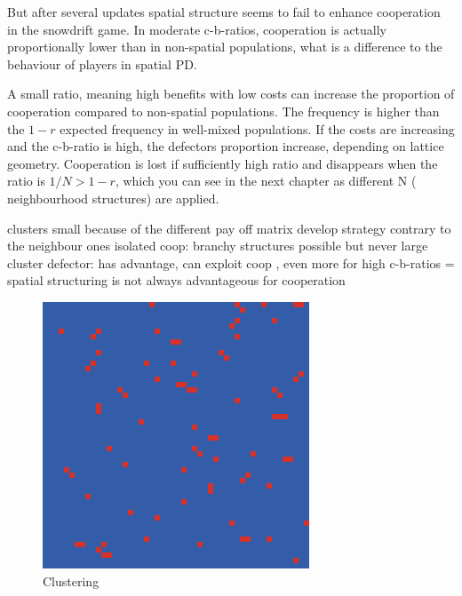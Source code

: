 \documentclass[DIV=calc, paper=a4, fontsize=11pt, twocolumn]{scrartcl}	 %
\begin{document}
But after several updates spatial structure seems to fail to enhance cooperation in the snowdrift game. In moderate c-b-ratios, cooperation is actually proportionally lower than in non-spatial populations, what is a difference to the behaviour of players in spatial PD. 

A small ratio, meaning high benefits with low costs can increase the proportion of cooperation compared to non-spatial populations. The frequency is higher than the $1-r$ expected frequency in well-mixed populations. If the costs are increasing and the c-b-ratio is high, the defectors proportion increase, depending on lattice geometry. Cooperation is lost if sufficiently high ratio and disappears when the ratio is $1/N > 1- r$, which you can see in the next chapter as different N ( neighbourhood structures) are applied. 

clusters small because of the different pay off matrix
develop  strategy contrary to the neighbour ones 
isolated coop: branchy structures possible but never large cluster 
defector: has advantage, can exploit coop , even more for high c-b-ratios
= spatial structuring is not always advantageous for cooperation


\begin{figure}[here]
\centering
\begin{minipage}{.35\textwidth}
  \centering
  \includegraphics[width=1\linewidth]{HDspatial8cost01}
 \caption{Clustering}
\label{fig:PDspatialcluster}
\end{minipage}%
\end{figure}
\end{document}
